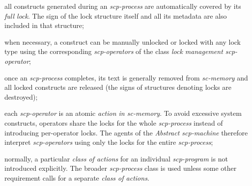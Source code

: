 \begin{frame}{}
\topline
\justifying
	\setlength{\emergencystretch}{2em}
\vspace{10mm}

\begin{textitemize}
\item all constructs generated during an \textit{scp-process} are automatically covered by its \textit{full lock}. The sign of the lock structure itself and all its metadata are also included in that structure;
\item when necessary, a construct can be manually unlocked or locked with any lock type using the corresponding \textit{scp-operators} of the class \textit{lock management scp-operator};
\item once an \textit{scp-process} completes, its text is generally removed from \textit{\mbox{sc-memory}} and all locked constructs are released (the signs of structures denoting locks are destroyed);
\end{textitemize}
\end{frame}

\begin{frame}{}
\topline
\justifying
\vspace{10mm}

\begin{textitemize}
\item each \textit{scp-operator} is an atomic \textit{action in sc-memory}. To avoid excessive system constructs, operators share the locks for the whole \textit{scp-process} instead of introducing per-operator locks. The agents of the \textit{Abstract scp-machine} therefore interpret \textit{scp-operators} using only the locks for the entire \textit{scp-process};
\item normally, a particular \textit{class of actions} for an individual \textit{scp-program} is not introduced explicitly. The broader \textit{scp-process} class is used unless some other requirement calls for a separate \textit{class of actions}.
\end{textitemize}
\end{frame}
